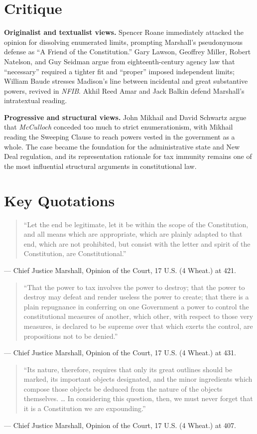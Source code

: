 \documentclass[12pt]{article}
\begin{document}
\section{Critique}

\textbf{Originalist and textualist views.} Spencer Roane immediately attacked the opinion for dissolving enumerated limits, prompting Marshall's pseudonymous defense as ``A Friend of the Constitution.'' Gary Lawson, Geoffrey Miller, Robert Natelson, and Guy Seidman argue from eighteenth-century agency law that ``necessary'' required a tighter fit and ``proper'' imposed independent limits; William Baude stresses Madison's line between incidental and great substantive powers, revived in \textit{NFIB}. Akhil Reed Amar and Jack Balkin defend Marshall's intratextual reading.

\textbf{Progressive and structural views.} John Mikhail and David Schwartz argue that \textit{McCulloch} conceded too much to strict enumerationism, with Mikhail reading the Sweeping Clause to reach powers vested in the government as a whole. The case became the foundation for the administrative state and New Deal regulation, and its representation rationale for tax immunity remains one of the most influential structural arguments in constitutional law.

\section{Key Quotations}

\begin{quote}
``Let the end be legitimate, let it be within the scope of the Constitution, and all means which are appropriate, which are plainly adapted to that end, which are not prohibited, but consist with the letter and spirit of the Constitution, are Constitutional.''
\end{quote}
\noindent --- Chief Justice Marshall, Opinion of the Court, 17 U.S. (4 Wheat.) at 421.

\begin{quote}
``That the power to tax involves the power to destroy; that the power to destroy may defeat and render useless the power to create; that there is a plain repugnance in conferring on one Government a power to control the constitutional measures of another, which other, with respect to those very measures, is declared to be supreme over that which exerts the control, are propositions not to be denied.''
\end{quote}
\noindent --- Chief Justice Marshall, Opinion of the Court, 17 U.S. (4 Wheat.) at 431.

\begin{quote}
``Its nature, therefore, requires that only its great outlines should be marked, its important objects designated, and the minor ingredients which compose those objects be deduced from the nature of the objects themselves. \ldots{} In considering this question, then, we must never forget that it is a Constitution we are expounding.''
\end{quote}
\noindent --- Chief Justice Marshall, Opinion of the Court, 17 U.S. (4 Wheat.) at 407.
\end{document}

